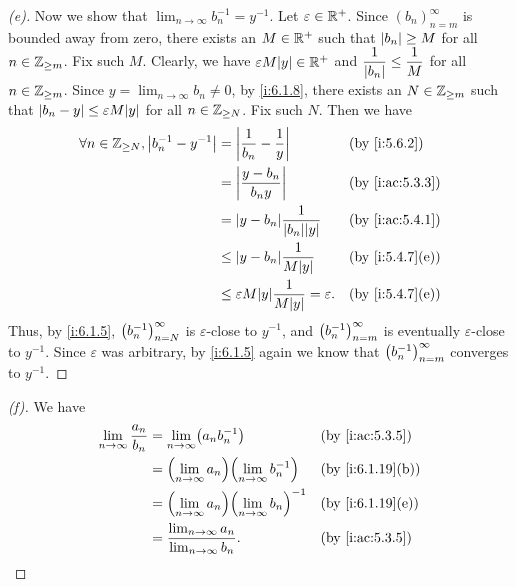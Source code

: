 \begin{proof}[(e)]
  Now we show that \(\lim_{n \to \infty} b_n^{-1} = y^{-1}\).
  Let \(\varepsilon \in \mathbb{R}^+\).
  Since \((b_n)_{n = m}^\infty\) is bounded away from zero, there exists an \(M \in \mathbb{R}^+\) such that \(\left\lvert b_n\right\rvert \geq M\) for all \(n \in \mathbb{Z}_{\geq m}\).
  Fix such \(M\).
  Clearly, we have \(\varepsilon M \abs{y} \in \R^+\) and \(\dfrac{1}{\left\lvert b_n\right\rvert} \leq \dfrac{1}{M}\) for all \(n \in \mathbb{Z}_{\geq m}\).
  Since \(y = \lim_{n \to \infty} b_n \neq 0\), by \cref{i:6.1.8}, there exists an \(N \in \mathbb{Z}_{\geq m}\) such that \(\abs{b_n - y} \leq \varepsilon M \abs{y}\) for all \(n \in \mathbb{Z}_{\geq N}\).
  Fix such \(N\).
  Then we have
  \begin{align*}
    \forall n \in \Z_{\geq N}, \abs{b_n^{-1} - y^{-1}} & = \abs{\dfrac{1}{b_n} - \dfrac{1}{y}}                       &  & \by{i:5.6.2}    \\
                                                       & = \abs{\dfrac{y - b_n}{b_n y}}                              &  & \by{i:ac:5.3.3} \\
                                                       & = \abs{y - b_n}\dfrac{1}{\abs{b_n}\abs{y}}                  &  & \by{i:ac:5.4.1} \\
                                                       & \leq \abs{y - b_n}\dfrac{1}{M\abs{y}}                       &  & \by{i:5.4.7}[e] \\
                                                       & \leq \varepsilon M\abs{y}\dfrac{1}{M\abs{y}} = \varepsilon. &  & \by{i:5.4.7}[e]
  \end{align*}
  Thus, by \cref{i:6.1.5}, \(\left\lparen b_n^{-1}\right\rparen_{n = N}^\infty\) is \(\varepsilon\)-close to \(y^{-1}\), and \(\left\lparen b_n^{-1}\right\rparen_{n = m}^\infty\) is eventually \(\varepsilon\)-close to \(y^{-1}\).
  Since \(\varepsilon\) was arbitrary, by \cref{i:6.1.5} again we know that \(\left\lparen b_n^{-1}\right\rparen_{n = m}^\infty\) converges to \(y^{-1}\).
\end{proof}

\begin{proof}[(f)]
  We have
  \begin{align*}
    \lim_{n \to \infty} \dfrac{a_n}{b_n} & = \lim_{n \to \infty} \pa{a_n b_n^{-1}}                          &  & \by{i:ac:5.3.5}  \\
                                         & = \pa{\lim_{n \to \infty} a_n} \pa{\lim_{n \to \infty} b_n^{-1}} &  & \by{i:6.1.19}[b] \\
                                         & = \pa{\lim_{n \to \infty} a_n} \pa{\lim_{n \to \infty} b_n}^{-1} &  & \by{i:6.1.19}[e] \\
                                         & = \dfrac{\lim_{n \to \infty} a_n}{\lim_{n \to \infty} b_n}.      &  & \by{i:ac:5.3.5}
  \end{align*}
\end{proof}

